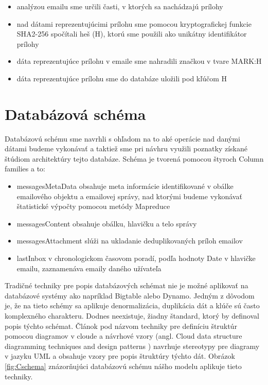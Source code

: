 \documentclass[11pt,twoside,a4paper]{book}
\begin{document}
\begin{itemize}
 \item analýzou emailu sme určili časti, v ktorých sa nachádzajú prílohy
 \item nad dátami reprezentujúcimi prílohu sme pomocou kryptografickej funkcie SHA2-256 spočítali heš (H), ktorú sme použili ako unikátny identifikátor prílohy
 \item dáta reprezentujúce prílohu v emaile sme nahradili značkou v tvare MARK:H
 \item dáta reprezentujúce prílohu sme do databáze uložili pod kľúčom H
\end{itemize}


\section{Databázová schéma}

Databázovú schému sme navrhli s ohľadom na to aké operácie nad danými dátami budeme vykonávať a taktiež sme pri návhru využili poznatky získané štúdiom architektúry tejto databáze. Schéma je tvorená pomocou štyroch Column families a to:

\begin{itemize}
 \item messagesMetaData obsahuje meta informácie identifikované v obálke emailového objektu a emailovej správy, nad ktorými budeme vykonávať štatistické výpočty pomocou metódy Mapreduce
 \item messagesContent obsahuje obálku, hlavičku a telo správy
 \item messagesAttachment slúži na ukladanie deduplikovaných príloh emailov  
 \item lastInbox v chronologickom časovom poradí, podľa hodnoty Date v hlavičke emailu, zaznamenáva emaily daného užívateľa
\end{itemize}

Tradičné techniky pre popis databázových schémat nie je možné aplikovať na databázové systémy ako napríklad Bigtable alebo Dynamo. Jedným z dôvodom je, že na tieto schémy sa aplikuje denormalizácia, duplikácia dát a klúče sú často komplexného charakteru. Dodnes neexistuje, žiadny štandard, ktorý by definoval popis týchto schémat. Článok pod názvom techniky pre definíciu štruktúr pomocou diagramov v cloude a návrhové vzory (angl. Cloud data structure diagramming techniques and design patterns \cite{CloudDataStructureDiag}) navrhuje stereotypy pre diagramy v jazyku UML a obsahuje vzory pre popis štruktúry týchto dát. Obrázok \ref{fig:Cschema} znázorňujúci databázovú schému nášho modelu aplikuje tieto techniky.
\end{document}
